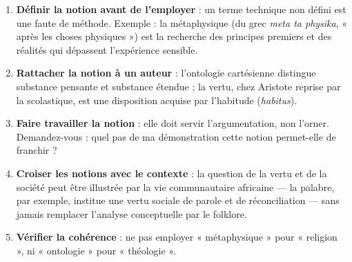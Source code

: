 \documentclass[11pt]{article}
\newcommand{\cle}[1]{{\popxbold\color{popdark}#1}}
\begin{document}
\begin{methode}
\begin{enumerate}
\item \textbf{Définir la notion avant de l'employer} : un terme technique non défini est une faute de méthode. Exemple : la \cle{métaphysique} (du grec \emph{meta ta physika}, « après les choses physiques ») est la recherche des principes premiers et des réalités qui dépassent l'expérience sensible.
\item \textbf{Rattacher la notion à un auteur} : l'ontologie cartésienne distingue substance pensante et substance étendue ; la vertu, chez Aristote reprise par la scolastique, est une disposition acquise par l'habitude (\emph{habitus}).
\item \textbf{Faire travailler la notion} : elle doit servir l'argumentation, non l'orner. Demandez-vous : quel pas de ma démonstration cette notion permet-elle de franchir ?
\item \textbf{Croiser les notions avec le contexte} : la question de la \cle{vertu} et de la \cle{société} peut être illustrée par la vie communautaire africaine — la palabre, par exemple, institue une vertu sociale de parole et de réconciliation — sans jamais remplacer l'analyse conceptuelle par le folklore.
\item \textbf{Vérifier la cohérence} : ne pas employer « métaphysique » pour « religion », ni « ontologie » pour « théologie ».
\end{enumerate}
\end{methode}
\end{document}
